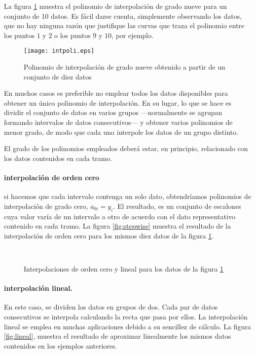 La figura \ref{fig:intepol} muestra el polinomio de interpolación de grado nueve para un conjunto de 10 datos. Es fácil darse cuenta, simplemente observando los datos, que no hay ninguna razón que justifique las curvas que traza el polinomio entre los puntos $1$ y $2$  o los puntos $9$ y $10$, por ejemplo.

\begin{figure}[h]
\centering
\texttt{[image: intpoli.eps]}
\caption{Polinomio de interpolación de grado nueve obtenido a partir de un conjunto de diez datos} 
\label{fig:intepol}
\end{figure}

En muchos casos es preferible no emplear todos los datos disponibles para obtener un único polinomio de interpolación. En su lugar, lo que se hace es dividir el conjunto de datos en varios grupos ---normalmente se agrupan formando intervalos de datos consecutivos--- y obtener varios polinomios de menor grado, de modo que cada uno interpole los datos de un grupo distinto. 

El grado de los polinomios empleados deberá estar, en principio, relacionado con los datos contenidos en cada tramo.

\paragraph{interpolación de orden cero}  si hacemos que cada intervalo contenga un solo dato, obtendríamos polinomios de interpolación de grado cero, $a_{0i}=y_i$. El resultado, es un conjunto de escalones cuya valor varía de un intervalo a otro de acuerdo con el dato representativo contenido en cada tramo. La figura \ref{fig:stepwise} muestra el resultado de la interpolación de orden cero para los mismos diez datos de la figura \ref{fig:intepol}.

\begin{figure}[h]
\centering
{} \qquad 
{}\\
\caption{Interpolaciones de orden cero y lineal para los datos de la figura \ref{fig:intepol} }
\end{figure}


\paragraph{interpolación lineal.}  En este caso, se dividen los datos en grupos de dos. Cada par de datos consecutivos se interpola calculando la recta que pasa por ellos. La interpolación lineal se emplea en muchas aplicaciones debido a su sencillez de cálculo. La figura \ref{fig:lineal}, muestra el resultado de aproximar linealmente los mismos datos contenidos en los ejemplos anteriores.

